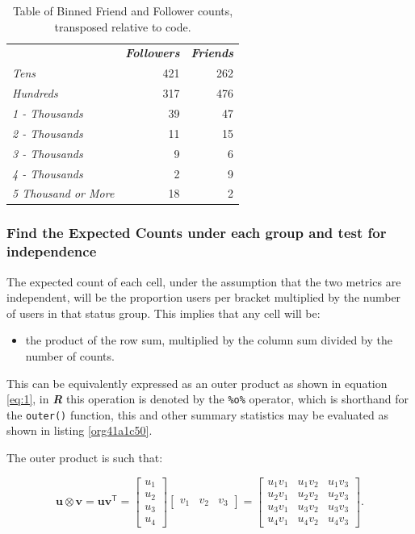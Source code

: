 \documentclass[11pt]{article}
\begin{document}
\begin{table}[htbp]
\caption{\label{tab:org561c7ec}Table of Binned Friend and Follower counts, transposed relative to code.}
\centering
\begin{tabular}{lrr}
 & \textbf{\textbf{\emph{Followers}}} & \textbf{\textbf{\emph{Friends}}}\\
\emph{Tens} & 421 & 262\\
\emph{Hundreds} & 317 & 476\\
\emph{1 - Thousands} & 39 & 47\\
\emph{2 - Thousands} & 11 & 15\\
\emph{3 - Thousands} & 9 & 6\\
\emph{4 - Thousands} & 2 & 9\\
\emph{5 Thousand or More} & 18 & 2\\
\end{tabular}
\end{table}

\subsubsection{Find the Expected Counts under each group and test for independence}
\label{sec:org6760b83}
The expected count of each cell, under the assumption that the two metrics are
independent, will be the proportion users per bracket multiplied by the number
of users in that status group. This implies that any cell will be:

\begin{itemize}
\item the product of the row sum, multiplied by the column sum divided by the number of counts.
\end{itemize}

This can be equivalently expressed as an outer product as shown in equation
\eqref{eq:1}, in \textbf{\emph{R}} this operation is denoted by the \texttt{\%o\%} operator, which is
shorthand for the \texttt{outer()} function, this and other summary statistics may be
evaluated as shown in listing \ref{org41a1c50}.

The outer product is such that:


$$
\mathbf{u} \otimes \mathbf {v} =\mathbf {u} \mathbf {v} ^{\textsf {T}}={\begin{bmatrix}u_{1}\\u_{2}\\u_{3}\\u_{4}\end{bmatrix}}{\begin{bmatrix}v_{1}&v_{2}&v_{3}\end{bmatrix}}={\begin{bmatrix}u_{1}v_{1}&u_{1}v_{2}&u_{1}v_{3}\\u_{2}v_{1}&u_{2}v_{2}&u_{2}v_{3}\\u_{3}v_{1}&u_{3}v_{2}&u_{3}v_{3}\\u_{4}v_{1}&u_{4}v_{2}&u_{4}v_{3}\end{bmatrix}}.
$$
\end{document}
